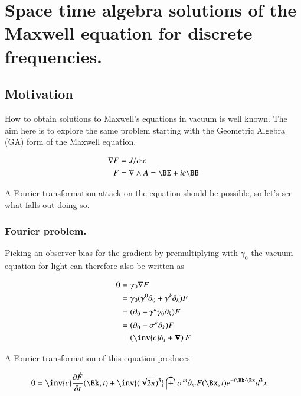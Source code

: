 

\chapter{Space time algebra solutions of the Maxwell equation for discrete frequencies.}
\label{chap:maxwellVacuum}
\date{July 2, 2009}

\beginArtWithToc

\section{Motivation}

How to obtain solutions to Maxwell's equations in vacuum is well known.  The aim here is to explore the same problem starting with the Geometric Algebra (GA) form of the Maxwell equation.

\begin{align}\label{eqn:maxwell}
\grad F &= J/\epsilon_0 c \\
F &= \grad \wedge A = \BE + i c \BB
\end{align}

A Fourier transformation attack on the equation should be possible, so let's see what falls out doing so.

\subsection{Fourier problem.}

Picking an observer bias for the gradient by premultiplying with $\gamma_0$ the vacuum equation for light can therefore also be written as

\begin{align*}
0
&= \gamma_0 \grad F \\
&= \gamma_0 (\gamma^0 \partial_0 + \gamma^k \partial_k) F \\
&= (\partial_0 - \gamma^k \gamma_0 \partial_k) F \\
&= (\partial_0 + \sigma^k \partial_k) F \\
&= \left(\inv{c}\partial_t + \spacegrad \right) F \\
\end{align*}

A Fourier transformation of this equation produces

\begin{align*}
0 &= \inv{c} \PD{t}{\hat{F}}(\Bk,t) + \inv{(\sqrt{2\pi})^3} \int \sigma^m \partial_m F(\Bx,t) e^{-i \Bk \cdot \Bx} d^3 x
\end{align*}

